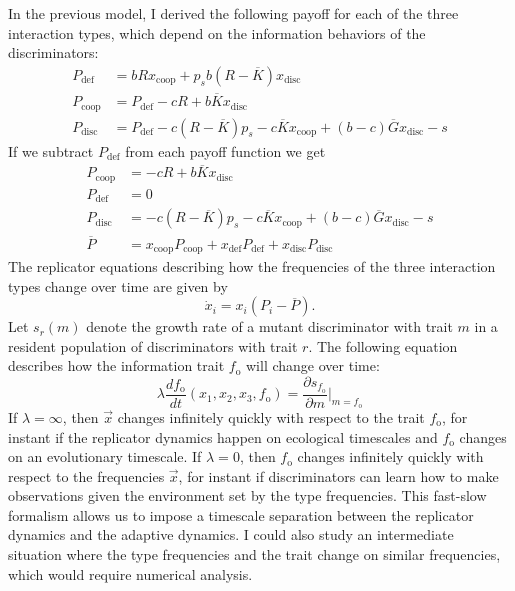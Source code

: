 \documentclass{article}
\begin{document}
In the previous model, I derived the following payoff for each of the three interaction types, which depend on the information behaviors of the discriminators: 
\begin{align*}
P_{\text{def}}&=bRx_{\text{coop}}+p_sb(R-\overline{K})x_{\text{disc}}
\\P_{\text{coop}}&=P_\text{def}-cR+b\overline{K}x_{\text{disc}}
\\P_{\text{disc}}&=P_\text{def}-c(R-\overline{K})p_s-c\overline{K}x_\text{coop}+(b-c)\overline{G}x_\text{disc}-s
\end{align*}
If we subtract $P_\text{def}$ from each payoff function we get
\begin{align*}
P_\text{coop}&=-cR+b\overline{K}x_\text{disc}
\\ P_\text{def}&=0
\\ P_\text{disc}&=-c(R-\overline{K})p_s-c\overline{K}x_\text{coop}+(b-c)\overline{G}x_\text{disc}-s
\\\overline{P}&=x_{\text{coop}}P_{\text{coop}}+x_{\text{def}}P_{\text{def}}+x_{\text{disc}}P_{\text{disc}}
\end{align*}  
The replicator equations describing how the frequencies of the three interaction types change over time are given by 
\begin{equation}
\dot{x}_i=x_i(P_i-\overline{P}). \label{replicator}
\end{equation}
Let $s_r(m)$ denote the growth rate of a mutant discriminator with trait $m$ in a resident population of discriminators with trait $r$. The following equation describes how the information trait $f_\text{o}$ will change over time:
\begin{equation}
\lambda \frac{df_\text{o}}{dt}(x_1,x_2,x_3,f_\text{o})=\frac{\partial s_{f_\text{o}}}{\partial m}\bigg|_{m=f_\text{o}}
\end{equation}
If $\lambda=\infty$, then $\vec{x}$ changes infinitely quickly with respect to the trait $f_\text{o}$, for instant if the replicator dynamics happen on ecological timescales and $f_\text{o}$ changes on an evolutionary timescale.  If $\lambda=0$, then $f_\text{o}$ changes infinitely quickly with respect to the frequencies $\vec{x}$, for instant if discriminators can learn how to make observations given the environment set by the type frequencies. This fast-slow formalism allows us to impose a timescale separation between the replicator dynamics and the adaptive dynamics. I could also study an intermediate situation where the type frequencies and the trait change on similar frequencies, which would require numerical analysis.
\end{document}
